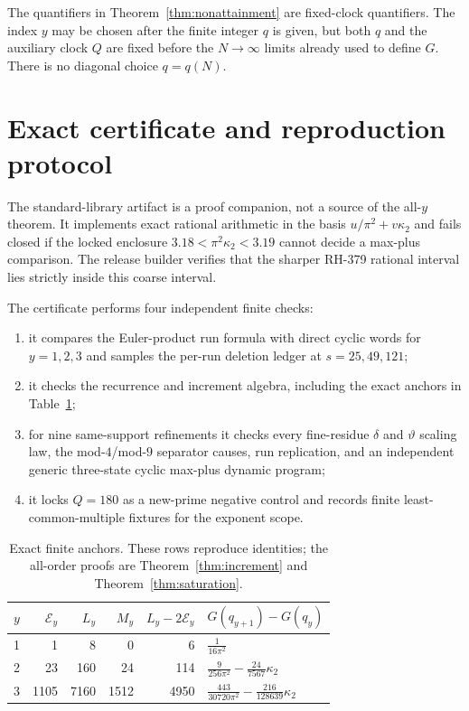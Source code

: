 \documentclass[11pt]{article}
\theoremstyle{definition}
\theoremstyle{remark}
\newcommand{\kap}{\kappa_2}
\newcommand{\Ecal}{\mathcal E}
\newcommand{\dd}{\delta}
\newcommand{\thh}{\vartheta}
\begin{document}
The quantifiers in Theorem~\ref{thm:nonattainment} are fixed-clock
quantifiers.  The index $y$ may be chosen after the finite integer $q$ is
given, but both $q$ and the auxiliary clock $Q$ are fixed before the
$N\to\infty$ limits already used to define $G$.  There is no diagonal
choice $q=q(N)$.

\section{Exact certificate and reproduction protocol}

The standard-library artifact is a proof companion, not a source of the
all-$y$ theorem.  It implements exact rational arithmetic in the basis
$u/\pi^2+v\kap$ and fails closed if the locked enclosure
$3.18<\pi^2\kap<3.19$ cannot decide a max-plus comparison.  The release
builder verifies that the sharper RH-379 rational interval lies strictly
inside this coarse interval.

The certificate performs four independent finite checks:
\begin{enumerate}[leftmargin=2em]
\item it compares the Euler-product run formula with direct cyclic words
      for $y=1,2,3$ and samples the per-run deletion ledger at
      $s=25,49,121$;
\item it checks the recurrence and increment algebra, including the exact
      anchors in Table~\ref{tab:anchors};
\item for nine same-support refinements it checks every fine-residue
      $\dd$ and $\thh$ scaling law, the mod-$4$/mod-$9$ separator causes,
      run replication, and an independent generic three-state cyclic
      max-plus dynamic program;
\item it locks $Q=180$ as a new-prime negative control and records finite
      least-common-multiple fixtures for the exponent scope.
\end{enumerate}

\begin{table}[ht]
\centering
\caption{Exact finite anchors.  These rows reproduce identities; the
all-order proofs are Theorem~\ref{thm:increment} and
Theorem~\ref{thm:saturation}.}
\label{tab:anchors}
\begin{tabular}{crrrrl}
\toprule
$y$&$\Ecal_y$&$L_y$&$M_y$&$L_y-2\Ecal_y$
 &$G(q_{y+1})-G(q_y)$\\
\midrule
1&1&8&0&6&$\frac{1}{16\pi^2}$\\[1mm]
2&23&160&24&114&$\frac{9}{256\pi^2}-\frac{24}{7567}\kap$\\[1mm]
3&1105&7160&1512&4950&$\frac{443}{30720\pi^2}-\frac{216}{128639}\kap$\\
\bottomrule
\end{tabular}
\end{table}
\end{document}
